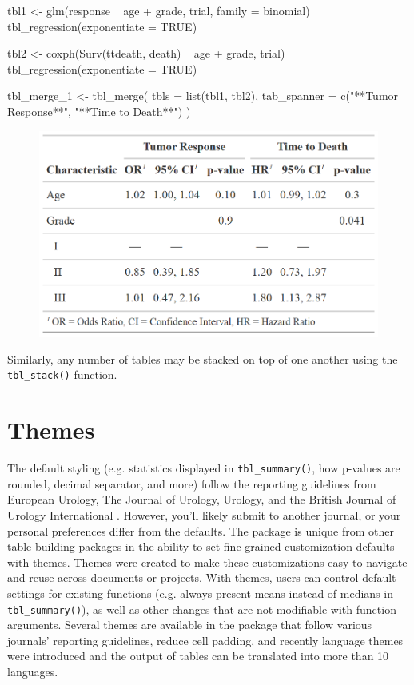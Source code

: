 \begin{example}
tbl1 <- 
  glm(response ~ age + grade, trial, family = binomial) %
  tbl_regression(exponentiate = TRUE)

tbl2 <-
  coxph(Surv(ttdeath, death) ~ age + grade, trial) %
  tbl_regression(exponentiate = TRUE) 

tbl_merge_1 <-
  tbl_merge(
    tbls = list(tbl1, tbl2),
    tab_spanner = c("**Tumor Response**", "**Time to Death**")
  )
\end{example}

\begin{figure}[h!]
  \includegraphics[scale=0.28]{merge.png}
  \centering
\end{figure}

Similarly, any number of  tables may be stacked on top of one another using the \texttt{tbl\_stack()} function.

\section{Themes}

The default styling (e.g. statistics displayed in \texttt{tbl\_summary()}, how p-values are rounded, decimal separator, and more) follow the reporting guidelines from European Urology, The Journal of Urology, Urology, and the British Journal of Urology International \citep{assel2019guidelines}.
However, you'll likely submit to another journal, or your personal preferences differ from the defaults.
The  package is unique from other table building packages in the ability to set fine-grained customization defaults with themes. 
Themes were created to make these customizations easy to navigate and reuse across documents or projects. 
With themes, users can control default settings for existing functions (e.g. always present means instead of medians in \texttt{tbl\_summary()}), as well as other changes that are not modifiable with function arguments.
Several themes are available in the package that follow various journals' reporting guidelines, reduce cell padding, and recently language themes were introduced and the output of  tables can be translated into more than 10 languages.

